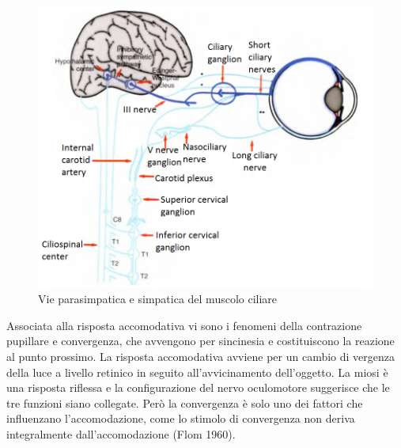 \begin{figure}[h!]
	\centering
	\includegraphics[scale=0.70]{source/immagini/accomodazione.png}
	\caption[figure]{Vie parasimpatica e simpatica del muscolo ciliare}
	\label{fig:issuexample}
\end{figure}
 
Associata alla risposta accomodativa vi sono i fenomeni della contrazione pupillare e convergenza, che avvengono per sincinesia e costituiscono la reazione al punto prossimo. La risposta accomodativa avviene per un cambio di vergenza della luce a livello retinico in seguito all’avvicinamento dell’oggetto. La miosi è una risposta riflessa e la configurazione del nervo oculomotore suggerisce che le tre funzioni siano collegate. Però la convergenza è solo uno dei fattori che influenzano l’accomodazione, come lo stimolo di convergenza non deriva integralmente dall’accomodazione (Flom 1960).

